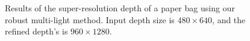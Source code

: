 \begin{figure}[!ht]
\quad
{}
\caption{Results of the super-resolution depth of a paper bag using our robust multi-light method. Input depth size is $480\times 640$, and the refined depth's is $960 \times 1280$. }
\label{fig:robust_sr}
\end{figure}


 
